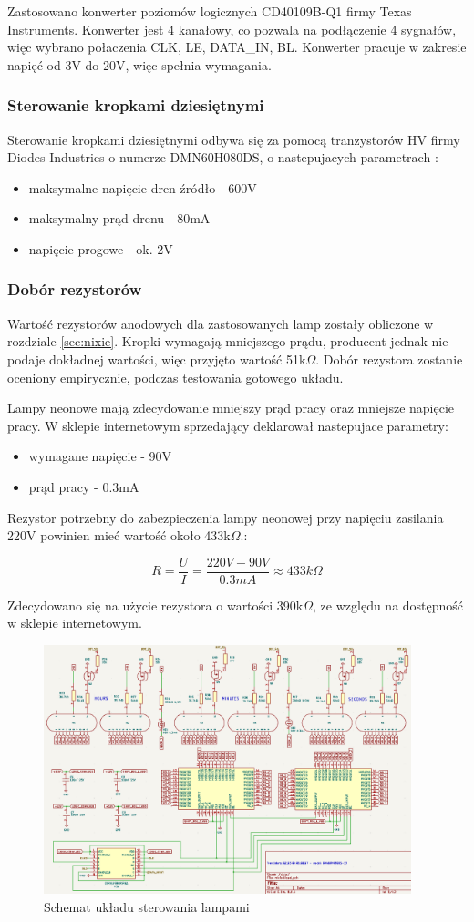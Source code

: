 \documentclass[../../main.tex]{subfiles}
\begin{document}
Zastosowano konwerter poziomów logicznych CD40109B-Q1 firmy Texas Instruments\cite{st:konwerter}.
Konwerter jest 4 kanałowy, co pozwala na podłączenie 4 sygnałów, więc wybrano połaczenia
CLK, LE, DATA\_IN, BL. Konwerter pracuje w zakresie napięć od 3V do 20V, więc spełnia wymagania.

\subsubsection{Sterowanie kropkami dziesiętnymi}
Sterowanie kropkami dziesiętnymi odbywa się za pomocą tranzystorów HV firmy Diodes Industries o numerze DMN60H080DS, 
o nastepujacych parametrach \cite{st:rejestry}:
\begin{itemize}
    \item maksymalne napięcie dren-źródło - 600V
    \item maksymalny prąd drenu - 80mA
    \item napięcie progowe - ok. 2V
\end{itemize}

\subsubsection{Dobór rezystorów}
Wartość rezystorów anodowych dla zastosowanych lamp zostały obliczone w rozdziale \ref{sec:nixie}.
Kropki wymagają mniejszego prądu, producent jednak nie podaje dokładnej wartości, więc przyjęto wartość 51k$\Omega$.
Dobór rezystora zostanie oceniony empirycznie, podczas testowania gotowego układu.

Lampy neonowe mają zdecydowanie mniejszy prąd pracy oraz mniejsze napięcie pracy. W sklepie internetowym sprzedający deklarował nastepujace parametry:
\begin{itemize}
    \item wymagane napięcie - 90V
    \item prąd pracy - 0.3mA
\end{itemize}

Rezystor potrzebny do zabezpieczenia lampy neonowej przy napięciu zasilania 220V powinien mieć wartość około 433k$\Omega$.:

\begin{equation}
    R = \frac{U}{I} = \frac{220V - 90V}{0.3mA} \approx 433k\Omega
\end{equation}

Zdecydowano się na użycie rezystora o wartości 390k$\Omega$, ze względu na dostępność w sklepie internetowym.

\begin{figure}[H]
    \centering
    \includegraphics[width=0.95\textwidth]{nixie.png}
    \caption{Schemat układu sterowania lampami}
\end{figure}
\end{document}
